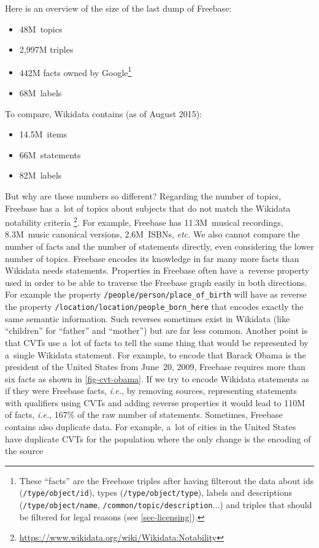 \documentclass{sig-alternate}
\begin{document}
Here is an overview of the size of the last dump of Freebase:

\begin{itemize}
  \setlength\itemsep{0em}
  \item 48M~topics
  \item 2,997M triples
  \item 442M facts owned by Google\footnote{These ``facts'' are the Freebase triples
      after having filterout the data about ids (\texttt{/type/object/id}),
      types (\texttt{/type/object/type}), labels and descriptions (\texttt{/type/object/name},
      \texttt{/common/topic/description}...) and triples that should be filtered
      for legal reasons (see \autoref{sec-licensing}).}
  \item 68M~labels
\end{itemize}

To compare, Wikidata contains (as of August 2015):

\begin{itemize}
    \setlength\itemsep{0em}
    \item 14.5M~items
    \item 66M~statements
    \item 82M~labels
\end{itemize}

But why are these numbers so different?
Regarding the number of topics, Freebase has a~lot of topics about subjects
that do not match the Wikidata notability criteria%
\footnote{\url{https://www.wikidata.org/wiki/Wikidata:Notability}}.
For example, Freebase has 11.3M~musical recordings, 8.3M~music canonical versions,
2.6M~ISBNs, \emph{etc.}
We also cannot compare the number of facts and the number of statements directly,
even considering the lower number of topics.
Freebase encodes its knowledge in far many more facts than Wikidata needs statements.
Properties in Freebase often have a~reverse property used in order to be able
to traverse the Freebase graph easily in both directions.
For example the property \texttt{/people/person/place\_of\_birth} will have as reverse
the property \texttt{/location/location/people\_born\_here} that encodes
exactly the same semantic information.
Such reverses sometimes exist in Wikidata (like ``children'' for ``father'' and ``mother'')
but are far less common.
Another point is that CVTs use a~lot of facts to tell the same thing that
would be represented by a~single Wikidata statement.
For example, to encode that Barack Obama is the president of the United States from June~20, 2009,
Freebase requires more than six facts as shown in \autoref{fig-cvt-obama}.
If we try to encode Wikidata statements as if they were Freebase facts, \emph{i.e.},
by removing sources, representing statements with qualifiers using CVTs
and adding reverse properties it would lead to 110M of facts,
\emph{i.e.}, 167\% of the raw number of statements.
Sometimes, Freebase contains also duplicate data.
For example, a~lot of cities in the United States have duplicate CVTs for the population
where the only change is the encoding of the source
\end{document}
